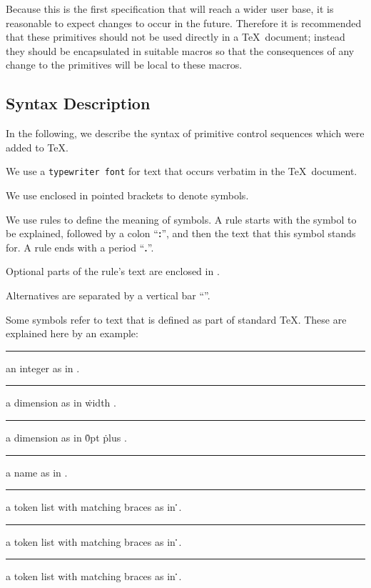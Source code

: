 Because this is the first specification that will reach a wider user base,
it is reasonable to expect changes to occur in the future. Therefore it is
recommended that these primitives should not be used directly in a
\TeX\ document; instead they should be encapsulated in suitable
macros so that the consequences of any change to the primitives will 
be local to these macros.

\subsection{Syntax Description}
In the following, we describe the syntax of primitive control sequences which were
added to \TeX.

\itemize
\item We use a {\tt typewriter font}
for text that occurs verbatim in the \TeX\ document.
\item We use  enclosed in pointed brackets to denote symbols.
\item We use rules to define the meaning of symbols.
A rule starts with the symbol
to be explained, followed by a colon ``{\bf :}'', and then the text that this symbol
stands for. A rule ends with a period ``{\bf .}''.
\item Optional parts of the rule's text
are enclosed in .
\item Alternatives are separated by a vertical bar ``\OR''\index{\OR}.
\item Some symbols refer to text that is defined as part of standard \TeX. These are explained here by an example:

\medskip
\rule{}: 
  an integer as in  .
\rule{}:
  a dimension as in  \.{width} .
\rule{}:
  a dimension as in  \.{0pt} \.{plus} .
\rule{}:
  a name as in  .
\rule{}:
  a token list  with matching braces as in
  \.{\LB}\.{\RB}.
\rule{}:
  a token list  with matching braces as in
  \.{\LB}\.{\RB}.
\rule{}:
  a token list with matching braces as in
  \.{\LB}\.{\RB}.
\medskip
\enditemize

